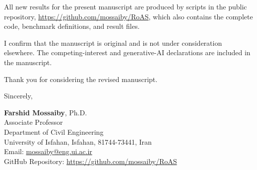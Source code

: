 \documentclass[11pt]{article}
\begin{document}
All new results for the present manuscript are produced by scripts in the public repository, \url{https://github.com/mossaiby/RoAS}, which also contains the complete code, benchmark definitions, and result files.

I confirm that the manuscript is original and is not under consideration elsewhere. The competing-interest and generative-AI declarations are included in the manuscript.

Thank you for considering the revised manuscript.

\vspace{1.5em}
Sincerely,

\vspace{0.5em}
\textbf{Farshid Mossaiby}, Ph.D.\\
Associate Professor\\
Department of Civil Engineering\\
University of Isfahan, Isfahan, 81744-73441, Iran\\
Email: \href{mailto:mossaiby@eng.ui.ac.ir}{mossaiby@eng.ui.ac.ir}\\
GitHub Repository: \url{https://github.com/mossaiby/RoAS}
\end{document}
